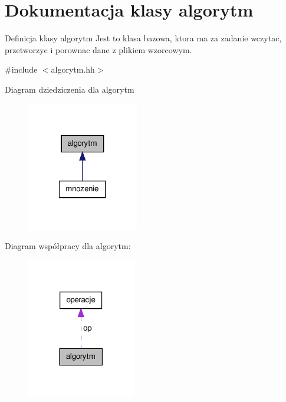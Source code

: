 \hypertarget{classalgorytm}{\section{\-Dokumentacja klasy algorytm}
\label{classalgorytm}
}


\-Definicja klasy algorytm \-Jest to klasa bazowa, ktora ma za zadanie wczytac, przetworzyc i porownac dane z plikiem wzorcowym.  




{\ttfamily \#include $<$algorytm.\-hh$>$}



\-Diagram dziedziczenia dla algorytm\nopagebreak
\begin{figure}[H]
\begin{center}
\leavevmode
\includegraphics[width=138pt]{classalgorytm__inherit__graph}
\end{center}
\end{figure}


\-Diagram współpracy dla algorytm\-:\nopagebreak
\begin{figure}[H]
\begin{center}
\leavevmode
\includegraphics[width=134pt]{classalgorytm__coll__graph}
\end{center}
\end{figure}
